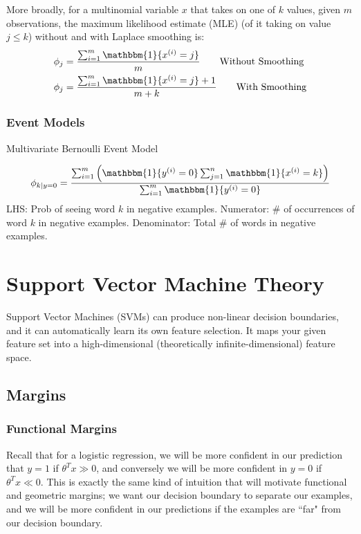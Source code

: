 \documentclass[letterpaper,10pt]{article}
\begin{document}
More broadly, for a multinomial variable $x$ that takes on one of $k$ values, given $m$ observations, the maximum likelihood estimate (MLE) (of it taking on value $j\leq k$) without and with Laplace smoothing is:
\begin{align}
\phi_j &= \frac{\sum_{i=1}^m \mathbbm{1}\{x^{(i)}=j\}}{m} \qquad \text{Without Smoothing} \\
\phi_j &= \frac{\sum_{i=1}^m \mathbbm{1}\{x^{(i)}=j\}+1}{m+k} \qquad \text{With Smoothing} 
\end{align}


\subsubsection{Event Models}

Multivariate Bernoulli Event Model

\begin{equation}
\phi_{k|y=0} = \frac{\sum_{i=1}^{m} \left(\mathbbm{1}\{y^{(i)}=0\}\sum_{j=1}^n \mathbbm{1}\{x^{(i)}=k\} \right) }{\sum_{i=1}^{m} \mathbbm{1}\{y^{(i)}=0\}}
\end{equation}
LHS: Prob of seeing word $k$ in negative examples.
Numerator: \# of occurrences of word $k$ in negative examples.
Denominator: Total \# of words in negative examples.






\section{Support Vector Machine Theory}

Support Vector Machines (SVMs) can produce non-linear decision boundaries, and it can automatically learn its own feature selection. It maps your given feature set into a high-dimensional (theoretically infinite-dimensional) feature space.

\subsection{Margins}

\subsubsection{Functional Margins}
Recall that for a logistic regression, we will be more confident in our prediction that $y=1$ if $\theta^Tx \gg 0$, and conversely we will be more confident in $y=0$ if $\theta^Tx \ll 0$. This is exactly the same kind of intuition that will motivate functional and geometric margins; we want our decision boundary to separate our examples, and we will be more confident in our predictions if the examples are ``far" from our decision boundary.
\end{document}
